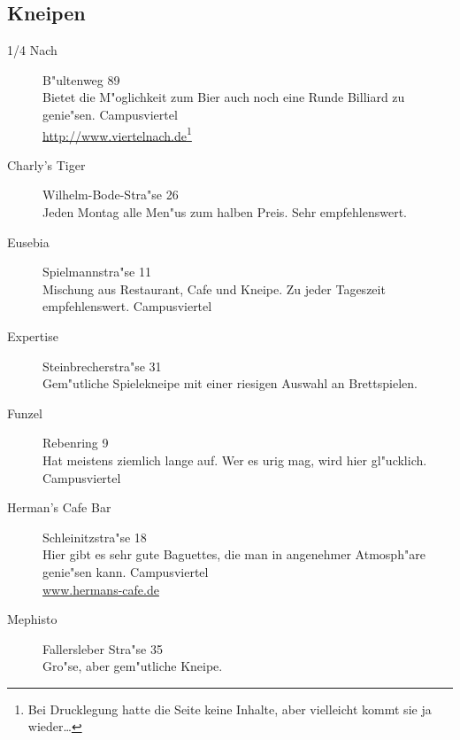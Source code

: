 \subsection{Kneipen}

\begin{description}

\item[1/4 Nach] \hfill B"ultenweg 89\\
Bietet die M"oglichkeit zum Bier auch noch eine Runde Billiard zu genie"sen.
Campusviertel\\
\url{http://www.viertelnach.de}\footnote{Bei Drucklegung hatte die Seite keine Inhalte, aber vielleicht kommt sie ja wieder\ldots}


\item[Charly's Tiger] \hfill Wilhelm-Bode-Stra"se 26\\
Jeden Montag alle Men"us zum halben Preis. Sehr empfehlenswert.


\item[Eusebia] \hfill Spielmannstra"se 11\\
Mischung aus Restaurant, Cafe und Kneipe. Zu jeder Tageszeit empfehlenswert.
Campusviertel

\item[Expertise] \hfill Steinbrecherstra"se 31\\
Gem"utliche Spielekneipe mit einer riesigen Auswahl an Brettspielen.

\item[Funzel] \hfill Rebenring 9\\
Hat meistens ziemlich lange auf. Wer es urig mag, wird hier gl"ucklich.
Campusviertel

\item[Herman's Cafe Bar] \hfill Schleinitzstra"se 18\\
Hier gibt es sehr gute Baguettes, die man in angenehmer Atmosph"are genie"sen kann.
Campusviertel\\
\url{www.hermans-cafe.de}

\item[Mephisto] \hfill Fallersleber Stra"se 35\\
Gro"se, aber gem"utliche Kneipe.



\end{description}
